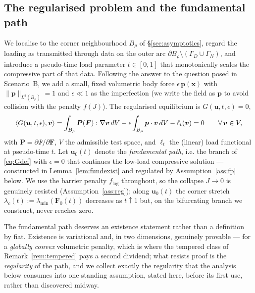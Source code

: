 \subsection{The regularised problem and the fundamental path}

We localise to the corner neighbourhood $B_\rho$ of \S\ref{sec:asymptotics}, regard the loading as transmitted through
data on the outer arc $\partial B_\rho\setminus(\Gamma_D\cup\Gamma_N)$, and introduce a pseudo-time load parameter
$t\in[0,1]$ that monotonically scales the compressive part of that data. Following the answer to the question posed in
Scenario~B, we add a small, fixed volumetric body force $\epsilon\,\bm{p}(\bm{x})$ with $\|\bm{p}\|_{L^2(B_\rho)}=1$
and $\epsilon\ll1$ as the imperfection (we write the field as $\bm{p}$ to avoid collision with the penalty $f(J)$). The
regularised equilibrium is $G(\bm{u},t,\epsilon)=0$,
\begin{equation}
    \label{eq:Gdef}
    \langle G(\bm{u},t,\epsilon),\bm{v}\rangle = \int_{B_\rho} \bm{P}(\bm{F}) : \nabla\bm{v}\,dV
    - \epsilon \int_{B_\rho} \bm{p}\cdot\bm{v}\,dV - \ell_t(\bm{v}) = 0 \qquad \forall\,\bm{v}\in V,
\end{equation}
with $\bm{P}=\partial\Psi/\partial\bm{F}$, $V$ the admissible test space, and $\ell_t$ the (linear) load functional at
pseudo-time $t$. Let $\bm{u}_0(t)$ denote the \emph{fundamental path}, i.e. the branch of \eqref{eq:Gdef} with
$\epsilon=0$ that continues the low-load compressive solution --- constructed in Lemma~\ref{lem:fundexist} and
regulated by Assumption~\ref{ass:fp} below. We use the barrier penalty $f_{\log}$ throughout, so the
collapse $J\to0$ is genuinely resisted (Assumption~\ref{ass:reg}); along $\bm{u}_0(t)$ the corner stretch
$\lambda_c(t):=\lambda_{\min}(\bm{F}_0(t))$ decreases as $t\uparrow1$ but, on the bifurcating branch we construct, never
reaches zero.

The fundamental path deserves an existence statement rather than a definition by fiat. Existence is variational and,
in two dimensions, genuinely provable --- for a \emph{globally convex} volumetric penalty, which is where the tempered
class of Remark~\ref{rem:tempered} pays a second dividend; what resists proof is the \emph{regularity} of the path,
and we collect exactly the regularity that the analysis below consumes into one standing assumption, stated here,
before its first use, rather than discovered midway.

